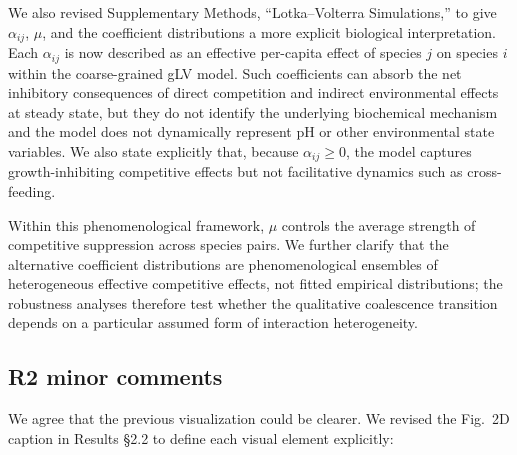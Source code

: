 We also revised Supplementary Methods, ``Lotka--Volterra Simulations,'' to give $\alpha_{ij}$, $\mu$, and the coefficient distributions a more explicit biological interpretation. Each $\alpha_{ij}$ is now described as an effective per-capita effect of species $j$ on species $i$ within the coarse-grained gLV model. Such coefficients can absorb the net inhibitory consequences of direct competition and indirect environmental effects at steady state, but they do not identify the underlying biochemical mechanism and the model does not dynamically represent pH or other environmental state variables. We also state explicitly that, because $\alpha_{ij} \geq 0$, the model captures growth-inhibiting competitive effects but not facilitative dynamics such as cross-feeding.

Within this phenomenological framework, $\mu$ controls the average strength of competitive suppression across species pairs. We further clarify that the alternative coefficient distributions are phenomenological ensembles of heterogeneous effective competitive effects, not fitted empirical distributions; the robustness analyses therefore test whether the qualitative coalescence transition depends on a particular assumed form of interaction heterogeneity.


\subsection*{R2 minor comments}


\responselabel
We agree that the previous visualization could be clearer. We revised the Fig.~2D caption in Results \S2.2 to define each visual element explicitly:



